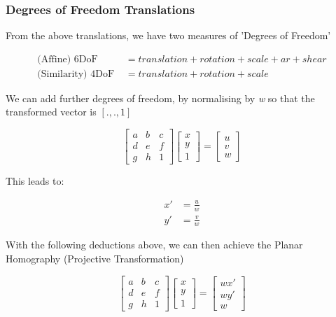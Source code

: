\subsubsection{Degrees of Freedom Translations}

From the above translations, we have two measures of 'Degrees of Freedom'

\begin{align*}
    \text{(Affine) 6DoF }&= translation+rotation+scale+ar+shear \\
    \text{(Similarity) 4DoF } &= translation+rotation+scale
\end{align*}

\noindent We can add further degrees of freedom, by normalising by \textit{w} so that the transformed vector is $[.,.,1]$

\begin{equation}
    \begin{bmatrix}
        a & b & c \\
        d & e & f \\
        g & h & 1
\end{bmatrix}
    \begin{bmatrix}
    x \\ y \\ 1
    \end{bmatrix}
    =
    \begin{bmatrix}
    u \\
    v \\
    w
    \end{bmatrix}
\end{equation}

\noindent This leads to:

\begin{align*}
    x' &= \frac{u}{w} \\
    y' &= \frac{v}{w}
\end{align*}

\noindent With the following deductions above, we can then achieve the Planar Homography (Projective Transformation)

\begin{equation}
    \begin{bmatrix}
        a & b & c \\
        d & e & f \\
        g & h & 1
\end{bmatrix}
    \begin{bmatrix}
    x \\ y \\ 1
    \end{bmatrix}
    =
    \begin{bmatrix}
    wx' \\
    wy' \\
    w
    \end{bmatrix}
\end{equation}

